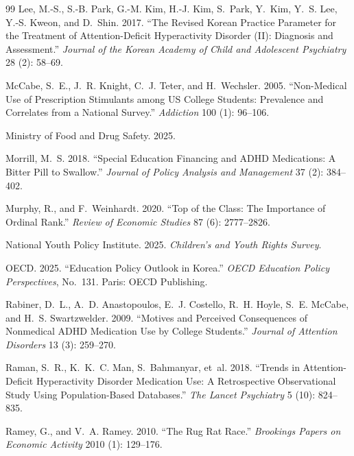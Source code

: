 \documentclass[12pt]{article}
\begin{document}
\begin{thebibliography}{99}
Lee, M.-S., S.-B. Park, G.-M. Kim, H.-J. Kim, S.~Park, Y.~Kim, Y.~S. Lee, Y.-S. Kweon, and D.~Shin. 2017. ``The Revised Korean Practice Parameter for the Treatment of Attention-Deficit Hyperactivity Disorder (II): Diagnosis and Assessment.'' \textit{Journal of the Korean Academy of Child and Adolescent Psychiatry} 28 (2): 58--69.

McCabe, S.~E., J.~R. Knight, C.~J. Teter, and H.~Wechsler. 2005. ``Non-Medical Use of Prescription Stimulants among US College Students: Prevalence and Correlates from a National Survey.'' \textit{Addiction} 100 (1): 96--106.

Ministry of Food and Drug Safety. 2025.

Morrill, M.~S. 2018. ``Special Education Financing and ADHD Medications: A Bitter Pill to Swallow.'' \textit{Journal of Policy Analysis and Management} 37 (2): 384--402.

Murphy, R., and F.~Weinhardt. 2020. ``Top of the Class: The Importance of Ordinal Rank.'' \textit{Review of Economic Studies} 87 (6): 2777--2826.

National Youth Policy Institute. 2025. \textit{Children's and Youth Rights Survey}.

OECD. 2025. ``Education Policy Outlook in Korea.'' \textit{OECD Education Policy Perspectives}, No.~131. Paris: OECD Publishing.

Rabiner, D.~L., A.~D. Anastopoulos, E.~J. Costello, R.~H. Hoyle, S.~E. McCabe, and H.~S. Swartzwelder. 2009. ``Motives and Perceived Consequences of Nonmedical ADHD Medication Use by College Students.'' \textit{Journal of Attention Disorders} 13 (3): 259--270.

Raman, S.~R., K.~K.~C. Man, S.~Bahmanyar, et~al. 2018. ``Trends in Attention-Deficit Hyperactivity Disorder Medication Use: A Retrospective Observational Study Using Population-Based Databases.'' \textit{The Lancet Psychiatry} 5 (10): 824--835.

Ramey, G., and V.~A. Ramey. 2010. ``The Rug Rat Race.'' \textit{Brookings Papers on Economic Activity} 2010 (1): 129--176.


\end{thebibliography}
\end{document}
